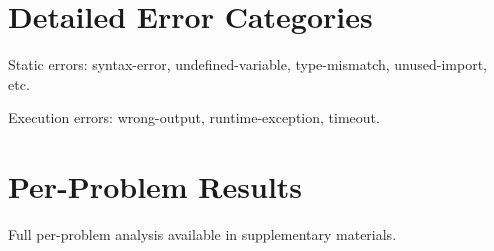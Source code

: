 \appendix

\section{Detailed Error Categories}

Static errors: syntax-error, undefined-variable, type-mismatch, unused-import, etc.

Execution errors: wrong-output, runtime-exception, timeout.

\section{Per-Problem Results}

Full per-problem analysis available in supplementary materials.
